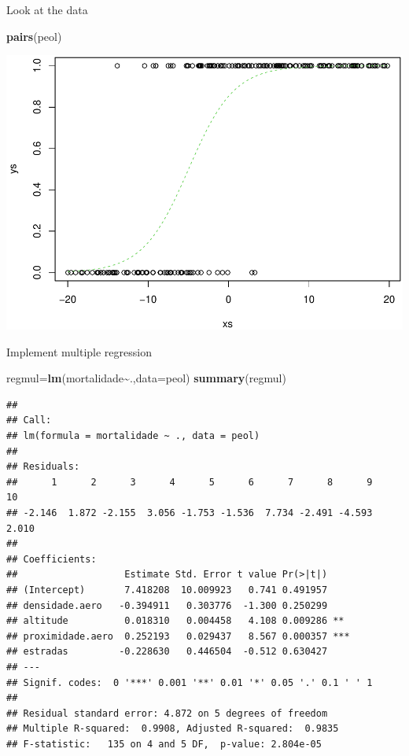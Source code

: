 \documentclass[
]{book}
\newenvironment{Shaded}{\begin{snugshade}}{\end{snugshade}}
\newcommand{\AttributeTok}[1]{\textcolor[rgb]{0.13,0.29,0.53}{#1}}
\newcommand{\FunctionTok}[1]{\textcolor[rgb]{0.13,0.29,0.53}{\textbf{#1}}}
\newcommand{\NormalTok}[1]{#1}
\newcommand{\OtherTok}[1]{\textcolor[rgb]{0.56,0.35,0.01}{#1}}
\newcommand{\SpecialCharTok}[1]{\textcolor[rgb]{0.81,0.36,0.00}{\textbf{#1}}}
\begin{document}
Look at the data

\begin{Shaded}
\begin{Highlighting}[]
\FunctionTok{pairs}\NormalTok{(peol)}
\end{Highlighting}
\end{Shaded}

\includegraphics{ECOMODbook_files/figure-latex/unnamed-chunk-14-1.pdf}

Implement multiple regression

\begin{Shaded}
\begin{Highlighting}[]
\NormalTok{regmul}\OtherTok{=}\FunctionTok{lm}\NormalTok{(mortalidade}\SpecialCharTok{\textasciitilde{}}\NormalTok{.,}\AttributeTok{data=}\NormalTok{peol)}
\FunctionTok{summary}\NormalTok{(regmul)}
\end{Highlighting}
\end{Shaded}

\begin{verbatim}
## 
## Call:
## lm(formula = mortalidade ~ ., data = peol)
## 
## Residuals:
##      1      2      3      4      5      6      7      8      9     10 
## -2.146  1.872 -2.155  3.056 -1.753 -1.536  7.734 -2.491 -4.593  2.010 
## 
## Coefficients:
##                   Estimate Std. Error t value Pr(>|t|)    
## (Intercept)       7.418208  10.009923   0.741 0.491957    
## densidade.aero   -0.394911   0.303776  -1.300 0.250299    
## altitude          0.018310   0.004458   4.108 0.009286 ** 
## proximidade.aero  0.252193   0.029437   8.567 0.000357 ***
## estradas         -0.228630   0.446504  -0.512 0.630427    
## ---
## Signif. codes:  0 '***' 0.001 '**' 0.01 '*' 0.05 '.' 0.1 ' ' 1
## 
## Residual standard error: 4.872 on 5 degrees of freedom
## Multiple R-squared:  0.9908, Adjusted R-squared:  0.9835 
## F-statistic:   135 on 4 and 5 DF,  p-value: 2.804e-05
\end{verbatim}
\end{document}
